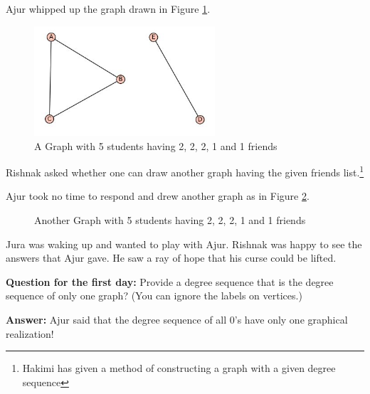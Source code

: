 Ajur whipped up the graph drawn in Figure \ref{dg3}. 

\begin{figure}
\begin{center}
\includegraphics[width=0.6\textwidth]{graphstory1-2.JPG}
\caption{A Graph with 5 students having 2, 2, 2, 1 and 1 friends}\label{dg3}
\end{center}
\end{figure}

Rishnak asked whether one can draw another graph having the given friends list.\footnote{Hakimi has given a method of constructing a graph with a given degree sequence}

Ajur took no time to respond and drew another graph as in Figure \ref{dg4}.

\begin{figure}
\begin{center}
\caption{Another Graph with 5 students having 2, 2, 2, 1 and 1 friends}\label{dg4}
\end{center}
\end{figure}

Jura was waking up and wanted to play with Ajur. Rishnak was happy to see the answers that Ajur gave. He saw a ray of hope that his curse could be lifted. 

\textbf{Question for the first day:}  Provide a degree sequence that is the degree sequence of only one graph? (You can ignore the labels on vertices.)

\textbf{Answer:} Ajur said that the degree sequence of all 0's have only one graphical realization!

